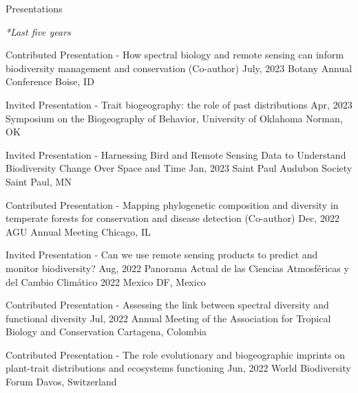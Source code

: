 \documentclass{resume} %
\begin{document}
\clearpage

\begin{rSection}{Presentations} 
\normalfont 

\em{*Last five years}

\begin{sSubsection}{Contributed Presentation - How spectral biology and remote sensing can inform biodiversity management and conservation}{ (Co-author) }{July, 2023}{ Botany Annual Conference }{Boise, ID}
\end{sSubsection}

\begin{sSubsection}{Invited Presentation - Trait biogeography: the role of past distributions}{ \hfill }{Apr, 2023}{ Symposium on the Biogeography of Behavior, University of Oklahoma }{Norman, OK}
\end{sSubsection}

\begin{sSubsection}{Invited Presentation - Harnessing Bird and Remote Sensing Data to Understand Biodiversity Change Over Space and Time}{ \hfill }{Jan, 2023}{ Saint Paul Audubon Society }{Saint Paul, MN}
\end{sSubsection}

\begin{sSubsection}{Contributed Presentation - Mapping phylogenetic composition and diversity in temperate forests for conservation and disease detection}{ (Co-author) }{Dec, 2022}{ AGU Annual Meeting }{Chicago, IL}
\end{sSubsection}

\begin{sSubsection}{Invited Presentation - Can we use remote sensing products to predict and monitor biodiversity?}{ \hfill }{Aug, 2022}{ Panorama Actual de las Ciencias Atmosféricas y del Cambio Climático 2022 }{Mexico DF, Mexico}
\end{sSubsection}

\begin{sSubsection}{Contributed Presentation - Assessing the link between spectral diversity and functional diversity}{ \hfill }{Jul, 2022}{ Annual Meeting of the Association for Tropical Biology and Conservation }{Cartagena, Colombia}
\end{sSubsection}

\begin{sSubsection}{Contributed Presentation - The role evolutionary and biogeographic imprints on plant-trait distributions and ecosystems functioning}{ \hfill }{Jun, 2022}{ World Biodiversity Forum }{Davos, Switzerland}
\end{sSubsection}


\end{rSection}
\end{document}
